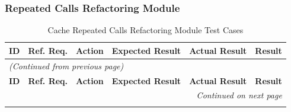 \documentclass[12pt, titlepage]{article}
\begin{document}
\subsubsection{Repeated Calls Refactoring Module}

\begin{longtable}{c
    >{\raggedright\arraybackslash}p{1.5cm}
    >{\raggedright\arraybackslash}p{4.5cm}
    >{\raggedright\arraybackslash}p{4cm}
  >{\raggedright\arraybackslash}p{3cm} c}
  \toprule
  \textbf{ID} & \textbf{Ref. Req.} & \textbf{Action} &
  \textbf{Expected Result} & \textbf{Actual Result} & \textbf{Result} \\
  \midrule
  \endfirsthead

  \multicolumn{6}{l}{\textit{(Continued from previous page)}} \\
  \toprule
  \textbf{ID} & \textbf{Ref. Req.} & \textbf{Action} &
  \textbf{Expected Result} & \textbf{Actual Result} & \textbf{Result} \\
  \midrule
  \endhead

  \multicolumn{6}{r}{\textit{Continued on next page}} \\
  \endfoot

  \bottomrule
  \caption{Cache Repeated Calls Refactoring Module Test Cases}
  \label{table:crc_refactor_tests}
  \endlastfoot


\end{longtable}
\end{document}
